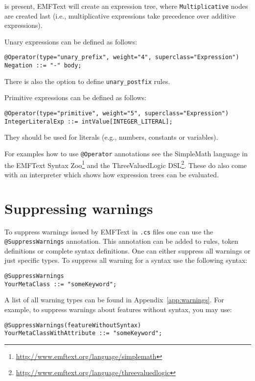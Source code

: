 is present, EMFText will create an expression tree, where
\texttt{Multiplicative} nodes are created last (i.e., multiplicative expressions 
take precedence over additive expressions).

Unary expressions can be defined as follows:

\lstset{language=CS}
\begin{lstlisting}
@Operator(type="unary_prefix", weight="4", superclass="Expression")	
Negation ::= "-" body;
\end{lstlisting}

There is also the option to define \texttt{unary\_postfix} rules.

Primitive expressions can be defined as follows:

\lstset{language=CS}
\begin{lstlisting}
@Operator(type="primitive", weight="5", superclass="Expression")
IntegerLiteralExp ::= intValue[INTEGER_LITERAL];
\end{lstlisting}

They should be used for literals (e.g., numbers, constants or variables).

For examples how to use \texttt{@Operator} annotations see the SimpleMath
language in the EMFText Syntax
Zoo\footnote{\url{http://www.emftext.org/language/simplemath}} and the
ThreeValuedLogic
DSL\footnote{\url{http://www.emftext.org/language/threevaluedlogic}}. These do
also come with an interpreter which shows how expression trees can be evaluated.

\section{Suppressing warnings}

To suppress warnings issued by EMFText in \texttt{.cs} files one can use the
\texttt{@SuppressWarnings} annotation. This annotation can be added to rules,
token definitions or complete syntax definitions. One can either suppress all 
warnings or just specific types. To suppress all warning for a syntax use the
following syntax:

\lstset{language=CS}
\begin{lstlisting}
@SuppressWarnings
YourMetaClass ::= "someKeyword";
\end{lstlisting}

A list of all warning types can be found in Appendix~\ref{app:warnings}. For
example, to suppress warnings about features without syntax, you may use:

\lstset{language=CS}
\begin{lstlisting}
@SuppressWarnings(featureWithoutSyntax)
YourMetaClassWithAttribute ::= "someKeyword";
\end{lstlisting}
